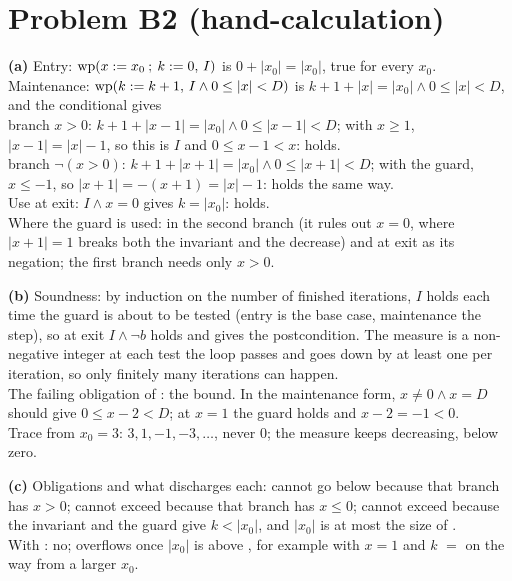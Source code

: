 \documentclass[11pt]{article}
\begin{document}
\section*{Problem B2 (hand-calculation)}\label{ans:B2}
\begin{answer}
\textbf{(a)} Entry: $\mathrm{wp}(x \mathrel{:=} x_0 \mathbin{;}\, k \mathrel{:=} 0,\,I)$ is $0 + \lvert
x_0\rvert = \lvert x_0\rvert$, true for every $x_0$. \\
Maintenance: $\mathrm{wp}(k \mathrel{:=} k + 1,\,I \wedge 0 \leq \lvert x\rvert < D)$ is $k +
1 + \lvert x\rvert = \lvert x_0\rvert \wedge 0 \leq \lvert x\rvert < D$, and
the conditional gives \\
\hspace*{2em} branch $x > 0$: $k + 1 + \lvert x - 1\rvert = \lvert x_0\rvert
\wedge 0 \leq \lvert x - 1\rvert < D$; with $x \geq 1$, $\lvert x - 1\rvert =
\lvert x\rvert - 1$, so this is $I$ and $0 \leq x - 1 < x$: holds. \\
\hspace*{2em} branch $\neg(x > 0)$: $k + 1 + \lvert x + 1\rvert = \lvert
x_0\rvert \wedge 0 \leq \lvert x + 1\rvert < D$; with the guard, $x \leq -1$,
so $\lvert x + 1\rvert = -(x + 1) = \lvert x\rvert - 1$: holds the same way. \\
Use at exit: $I \wedge x = 0$ gives $k = \lvert x_0\rvert$: holds. \\
Where the guard is used: in the second branch (it rules out $x = 0$, where
$\lvert x + 1\rvert = 1$ breaks both the invariant and the decrease) and at
exit as its negation; the first branch needs only $x > 0$.

\textbf{(b)} Soundness: by induction on the number of finished iterations,
$I$ holds each time the guard is about to be tested (entry is the base case,
maintenance the step), so at exit $I \wedge \neg b$ holds and gives the
postcondition. The measure is a non-negative integer at each test the loop
passes and goes down by at least one per iteration, so only finitely many
iterations can happen. \\
The failing obligation of : the bound. In the maintenance form,
$x \neq 0 \wedge x = D$ should give $0 \leq x - 2 < D$; at $x = 1$ the guard
holds and $x - 2 = -1 < 0$. \\
Trace from $x_0 = 3$: $3, 1, -1, -3, \ldots$, never $0$; the measure keeps
decreasing, below zero.

\textbf{(c)} Obligations and what discharges each:  cannot go below
 because that branch has $x > 0$;  cannot exceed
 because that branch has $x \leq 0$;  cannot exceed
 because the invariant and the guard give $k < \lvert x_0\rvert$,
and $\lvert x_0\rvert$ is at most the size of . \\
With : no;  overflows once $\lvert x_0\rvert$ is above
, for example with $x = 1$ and $k$ $=$  on the way
from a larger $x_0$.
\end{answer}
\end{document}
